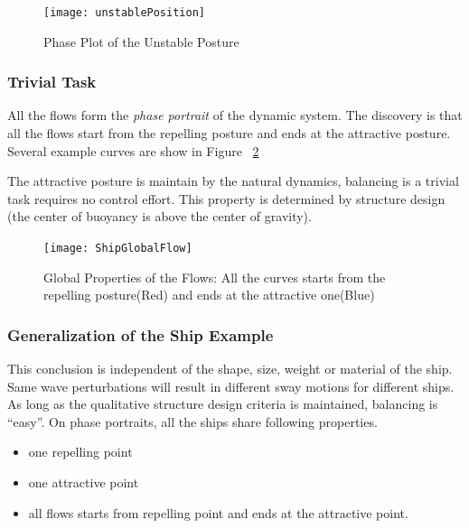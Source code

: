 \begin{figure}[!htbp]
  \begin{center}
      \texttt{[image: unstablePosition]}
    \caption{Phase Plot of the Unstable Posture}
    \label{fig:unStablePosture}
  \end{center}
\end{figure}


\subsubsection*{Trivial Task}
All the flows form the \emph{phase portrait} of the dynamic system. 
The discovery is that all the flows start from the repelling posture and ends at the attractive posture.
Several example curves are show in Figure ~\ref{fig:globalflow}

The attractive posture is maintain by the natural dynamics, balancing  is a  trivial task requires no control effort.
This property is determined by structure design (the center of buoyancy is above the center of gravity).

\begin{figure}[!htbp]
  \begin{center}
   \texttt{[image: ShipGlobalFlow]}
   \caption{Global Properties of the Flows: All the curves starts from the repelling posture(Red) and ends at the attractive one(Blue)}
   \label{fig:globalflow}
  \end{center}
\end{figure}

 



\subsubsection*{Generalization of the Ship Example} 
This conclusion is independent of the shape, size, weight or material of the ship. 
Same wave perturbations will result in different sway motions for different ships.
As long as the qualitative structure design criteria is maintained, balancing is ``easy''.
On phase portraits,  all the ships share following properties. 
\begin{itemize}
\item one repelling point 
\item one attractive point 
\item all flows starts from repelling point and ends at the  attractive point. 
\end{itemize}


